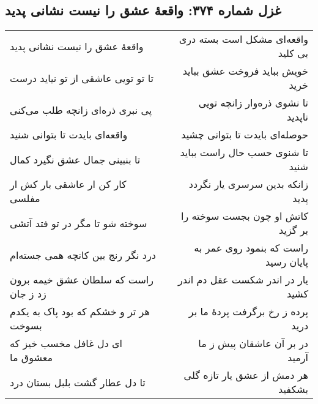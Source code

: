 \begin{center}
\section*{غزل شماره ۳۷۴: واقعهٔ عشق را نیست نشانی پدید}
\label{sec:374}
\begin{longtable}{l p{0.5cm} r}
واقعهٔ عشق را نیست نشانی پدید
&&
واقعه‌ای مشکل است بسته دری بی کلید
\\
تا تو تویی عاشقی از تو نیاید درست
&&
خویش بباید فروخت عشق بباید خرید
\\
پی نبری ذره‌ای زانچه طلب می‌کنی
&&
تا نشوی ذره‌وار زانچه تویی ناپدید
\\
واقعه‌ای بایدت تا بتوانی شنید
&&
حوصله‌ای بایدت تا بتوانی چشید
\\
تا بنبینی جمال عشق نگیرد کمال
&&
تا شنوی حسب حال راست بباید شنید
\\
کار کن ار عاشقی بار کش ار مفلسی
&&
زانکه بدین سرسری یار نگردد پدید
\\
سوخته شو تا مگر در تو فتد آتشی
&&
کاتش او چون بجست سوخته را بر گزید
\\
درد نگر رنج بین کانچه همی جسته‌ام
&&
راست که بنمود روی عمر به پایان رسید
\\
راست که سلطان عشق خیمه برون زد ز جان
&&
یار در اندر شکست عقل دم اندر کشید
\\
هر تر و خشکم که بود پاک به یکدم بسوخت
&&
پرده ز رخ برگرفت پردهٔ ما بر درید
\\
ای دل غافل مخسب خیز که معشوق ما
&&
در بر آن عاشقان پیش ز ما آرمید
\\
تا دل عطار گشت بلبل بستان درد
&&
هر دمش از عشق یار تازه گلی بشکفید
\\
\end{longtable}
\end{center}
